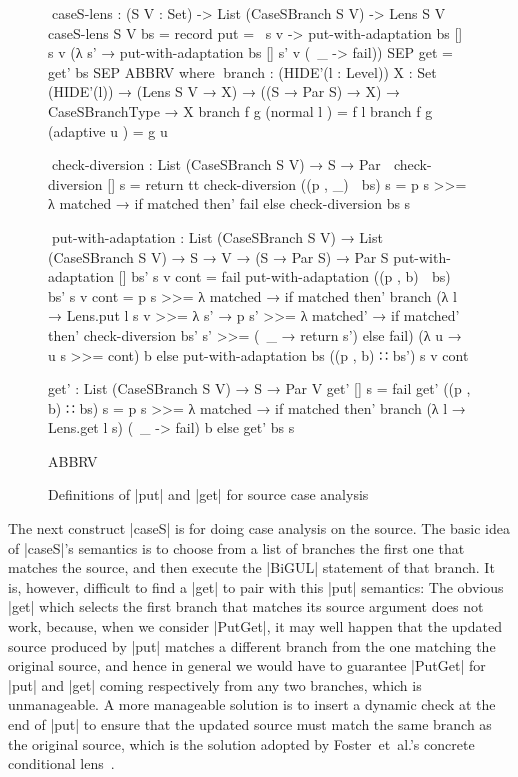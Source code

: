 \documentclass{sigplanconf}
\newcommand{\beforefigure}{\setlength{\mathindent}{0em}}
\begin{document}
\begin{figure}
\beforefigure
\begin{code}
^^^caseS-lens : (S V : Set) -> List (CaseSBranch S V) -> Lens S V
caseS-lens S V bs = record  {    put  = \ s v -> put-with-adaptation bs [] s v (λ s' → put-with-adaptation bs [] s' v (\ _ -> fail))
                            SEP  get  = get' bs SEP ABBRV }
  where
    ^^^branch : (HIDE'({l : Level})) {X : Set (HIDE'(l))} → (Lens S V → X) → ((S → Par S) → X) → CaseSBranchType → X
    branch f g (normal    l  ) = f  l
    branch f g (adaptive  u  ) = g  u

    ^^^check-diversion : List (CaseSBranch S V) → S → Par ⊤
    check-diversion  []              s = return tt
    check-diversion  ((p , _) ∷ bs)  s = p s >>= λ matched → if matched then' fail else check-diversion bs s

    ^^^put-with-adaptation : List (CaseSBranch S V) → List (CaseSBranch S V) → S → V → (S → Par S) → Par S
    put-with-adaptation []              bs' s v cont = fail
    put-with-adaptation ((p , b) ∷ bs)  bs' s v cont =
      p s >>= λ matched → if matched   then'  branch  (λ l →  Lens.put l s v >>= λ s' → p s' >>= λ matched' →
                                                              if matched' then' check-diversion bs' s' >>= (\ _ → return s') else fail)
                                                      (λ u → u s >>= cont) b
                                       else   put-with-adaptation bs ((p , b) ∷ bs') s v cont

    get' : List (CaseSBranch S V) → S → Par V
    get' []              s = fail
    get' ((p , b) ∷ bs)  s = p s >>= λ matched → if matched then' branch (λ l → Lens.get l s) (\ _ -> fail) b else get' bs s
    
    ABBRV
\end{code}
\caption{Definitions of |put| and |get| for source case analysis}
\label{fig:caseS}
\end{figure}

The next construct |caseS| is for doing case analysis on the source.
The basic idea of |caseS|'s semantics is to choose from a list of branches the first one that matches the source, and then execute the |BiGUL| statement of that branch.
It is, however, difficult to find a |get| to pair with this |put| semantics: The obvious |get| which selects the first branch that matches its source argument does not work, because, when we consider |PutGet|, it may well happen that the updated source produced by |put| matches a different branch from the one matching the original source, and hence in general we would have to guarantee |PutGet| for |put| and |get| coming respectively from any two branches, which is unmanageable.
A more manageable solution is to insert a dynamic check at the end of |put| to ensure that the updated source must match the same branch as the original source, which is the solution adopted by Foster~et~al.'s concrete conditional lens~\cite[Section~6.1]{Foster-lenses}.
\end{document}
